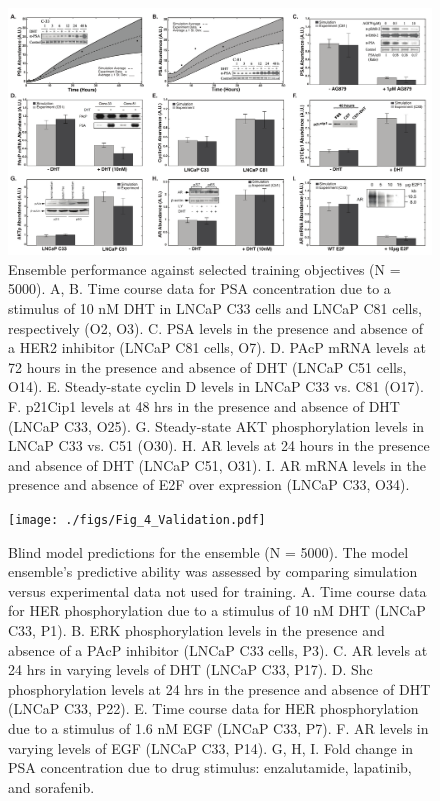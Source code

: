 \documentclass[12pt]{article}
\begin{document}
\clearpage

\begin{figure}\centering
\includegraphics[width=1.0\textwidth]{./figs/Fig_2_Training.pdf}
\caption{Ensemble performance against selected training objectives (N = 5000). A, B. Time course data for PSA concentration due to a stimulus of 10 nM DHT in LNCaP C33 cells and LNCaP C81 cells, respectively (O2, O3). C. PSA levels in the presence and absence of a HER2 inhibitor (LNCaP C81 cells, O7). D. PAcP mRNA levels at 72 hours in the presence and absence of DHT (LNCaP C51 cells, O14). E. Steady-state cyclin D levels in LNCaP C33 vs. C81 (O17). F. p21Cip1 levels at 48 hrs in the presence and absence of DHT (LNCaP C33, O25). G. Steady-state AKT phosphorylation levels in LNCaP C33 vs. C51 (O30). H. AR levels at 24 hours in the presence and absence of DHT (LNCaP C51, O31). I. AR mRNA levels in the presence and absence of E2F over expression (LNCaP C33, O34).}
\label{fg:Training}
\end{figure}

\clearpage

\begin{figure}\centering
\texttt{[image: ./figs/Fig\_4\_Validation.pdf]}
\caption{Blind model predictions for the ensemble (N = 5000). The model ensemble’s predictive ability was assessed by comparing simulation versus experimental data not used for training. A. Time course data for HER phosphorylation due to a stimulus of 10 nM DHT (LNCaP C33, P1). B. ERK phosphorylation levels in the presence and absence of a PAcP inhibitor (LNCaP C33 cells, P3). C. AR levels at 24 hrs in varying levels of DHT (LNCaP C33, P17). D. Shc phosphorylation levels at 24 hrs in the presence and absence of DHT (LNCaP C33, P22). E. Time course data for HER phosphorylation due to a stimulus of 1.6 nM EGF (LNCaP C33, P7). F. AR levels in varying levels of EGF (LNCaP C33, P14). G, H, I. Fold change in PSA concentration due to drug stimulus: enzalutamide, lapatinib, and sorafenib.}
\label{fg:Validation}
\end{figure}
\end{document}
